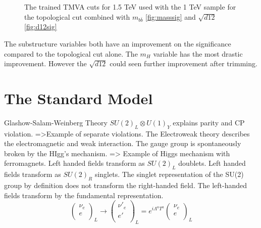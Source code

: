 \begin{figure}[H]
\hspace{-2.5cm}
\caption{The trained TMVA cuts for 1.5 TeV used with the 1 TeV sample for the topological cut combined with $m_{b\bar{b}}$ \ref{fig:masssig} and $\sqrt{d12}$ \ref{fig:d12sig}}
\label{fig:sig}
\end{figure}

The substructure variables both have an improvement on the significance compared to the topological cut alone. The $m_{H}$ variable has the most drastic improvement. However the $\sqrt{d12}$ could seen further improvement after trimming. 

\section{The Standard Model}
Glashow-Salam-Weinberg Theory $SU(2)_L \otimes U(1)_Y$ explains parity and CP violation. 
=>Example of separate violations. 
The Electroweak theory describes the electromagnetic and weak interaction. The gauge group is spontaneously broken by the HIgg's mechanism.
=> Example of Higgs mechanism with ferromagnets. 
Left handed fields transform as  $SU(2)_L$ doublets. Left handed fields transform as  $SU(2)_R$ singlets. The singlet representation of the SU(2) group by definition does not transform the right-handed field. The left-handed fields transform by the fundamental representation.
 \begin{equation}
     \begin{pmatrix}
         \nu_e \\
         e \\
        \end{pmatrix}_{L}
        \rightarrow
      \begin{pmatrix}
         \nu'_{e}\\
         e' \\
        \end{pmatrix}_L
        	=e^{i\Lambda^{a}T^{a}}
	\begin{pmatrix}
         \nu_e \\
         e \\
        \end{pmatrix}_L
 \end{equation}
 
